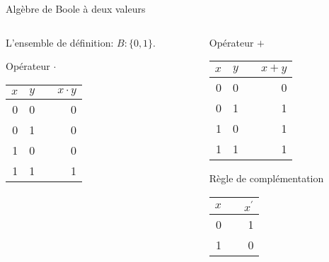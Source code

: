 \documentclass[presentation]{beamer}
\begin{document}
\begin{frame}[label={sec:org1dd3424}]{Algèbre de Boole à deux valeurs}
\begin{columns}
\begin{column}{0.48\columnwidth}
\begin{block}{}
L'ensemble de définition: \(B : \{0, 1 \}\).

Opérateur \(\cdot\)

\begin{center}
\begin{tabular}{rrlr}
\(x\) & \(y\) &  & \(x \cdot y\)\\[0pt]
\hline
0 & 0 &  & 0\\[0pt]
0 & 1 &  & 0\\[0pt]
1 & 0 &  & 0\\[0pt]
1 & 1 &  & 1\\[0pt]
\end{tabular}
\end{center}
\end{block}
\end{column}


\begin{column}{0.48\columnwidth}
\begin{block}{}
Opérateur \(+\)

\begin{center}
\begin{tabular}{rrlr}
\(x\) & \(y\) &  & \(x + y\)\\[0pt]
\hline
0 & 0 &  & 0\\[0pt]
0 & 1 &  & 1\\[0pt]
1 & 0 &  & 1\\[0pt]
1 & 1 &  & 1\\[0pt]
\end{tabular}
\end{center}

Règle de complémentation

\begin{center}
\begin{tabular}{rlr}
\(x\) &  & \(x^{\prime}\)\\[0pt]
\hline
0 &  & 1\\[0pt]
1 &  & 0\\[0pt]
\end{tabular}
\end{center}
\end{block}
\end{column}
\end{columns}
\end{frame}
\end{document}
